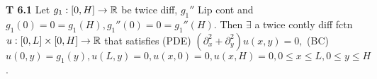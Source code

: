 {\bf T 6.1} Let $g_1: [0,H] \rightarrow \mathbb{R}$ be twice diff, $g_1''$ Lip cont and $g_1(0)=0=g_1(H), g_1''(0)=0=g_1''(H)$. Then $\exists$ a twice contly diff fctn $u: [0,L] \times [0,H] \rightarrow \mathbb{R}$ that satisfies (PDE) $(\partial_x^2 + \partial_y^2)u(x,y) = 0, $ (BC) $u(0,y)= g_1(y), u(L,y) = 0, u(x,0) = 0, u(x,H) = 0, 0 \leq x \leq L, 0 \leq y \leq H$.